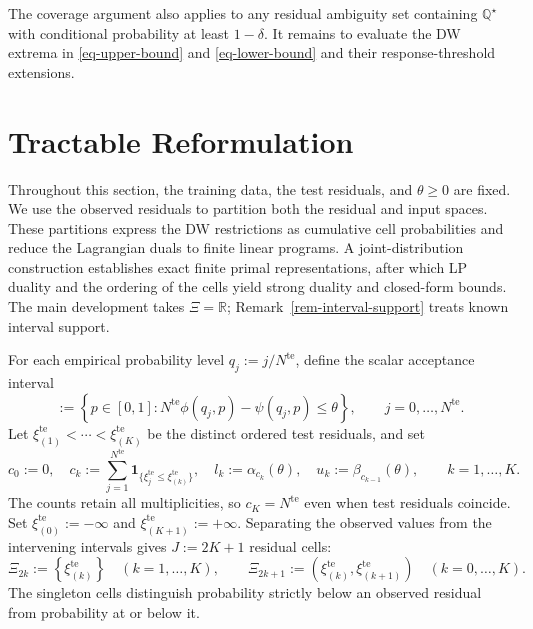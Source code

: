 \documentclass[review,11pt,3p,authoryear,nopreprintline]{elsarticle}
\begin{document}
The coverage argument also applies to any residual ambiguity set containing $\mathbb Q^\star$ with conditional probability at least $1-\delta$. It remains to evaluate the DW extrema in \eqref{eq-upper-bound} and \eqref{eq-lower-bound} and their response-threshold extensions.


\section{Tractable Reformulation}
\label{sec-reformulation}

Throughout this section, the training data, the test residuals, and $\theta\ge0$ are fixed. We use the observed residuals to partition both the residual and input spaces. These partitions express the DW restrictions as cumulative cell probabilities and reduce the Lagrangian duals to finite linear programs. A joint-distribution construction establishes exact finite primal representations, after which LP duality and the ordering of the cells yield strong duality and closed-form bounds. The main development takes $\Xi=\mathbb R$; Remark~\ref{rem-interval-support} treats known interval support.

For each empirical probability level $q_j:=j/N^{\mathrm{te}}$, define the scalar acceptance interval
\begin{equation}
  [\alpha_j(\theta),\beta_j(\theta)]
  :=\left\{p\in[0,1]:
  N^{\mathrm{te}}\phi(q_j,p)-\psi(q_j,p)\le\theta\right\},
  \qquad j=0,\ldots,N^{\mathrm{te}}.
  \label{eq-dw-rank-acceptance}
\end{equation}
Let $\xi_{(1)}^{\mathrm{te}}<\cdots<\xi_{(K)}^{\mathrm{te}}$ be the distinct ordered test residuals, and set
\begin{equation}
  c_0:=0,\quad
  c_k:=\sum_{j=1}^{N^{\mathrm{te}}}\mathbf1_{\{\xi_j^{\mathrm{te}}\le\xi_{(k)}^{\mathrm{te}}\}},\quad
  l_k:=\alpha_{c_k}(\theta),\quad
  u_k:=\beta_{c_{k-1}}(\theta),\qquad k=1,\ldots,K.
  \label{eq-dw-counts-and-levels}
\end{equation}
The counts retain all multiplicities, so $c_K=N^{\mathrm{te}}$ even when test residuals coincide. Set $\xi_{(0)}^{\mathrm{te}}:=-\infty$ and $\xi_{(K+1)}^{\mathrm{te}}:=+\infty$. Separating the observed values from the intervening intervals gives $J:=2K+1$ residual cells:
\begin{equation}
  \Xi_{2k}:=\left\{\xi_{(k)}^{\mathrm{te}}\right\}
    \quad\left(k=1,\ldots,K\right),
  \qquad
  \Xi_{2k+1}:=\left(\xi_{(k)}^{\mathrm{te}},\xi_{(k+1)}^{\mathrm{te}}\right)
    \quad\left(k=0,\ldots,K\right).
  \label{eq-residual-cells}
\end{equation}
The singleton cells distinguish probability strictly below an observed residual from probability at or below it.
\end{document}
